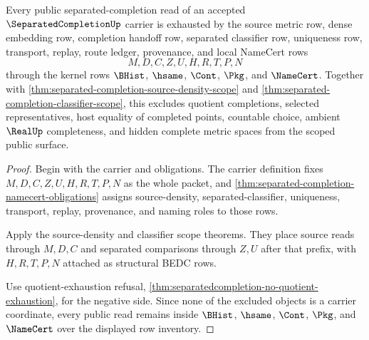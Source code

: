 \begin{theorem}
\label{thm:separated-completion-nonescape-scope}
Every public separated-completion read of an accepted $\SeparatedCompletionUp$ carrier is exhausted by the source metric row, dense embedding row, completion handoff row, separated classifier row, uniqueness row, transport, replay, route ledger, provenance, and local NameCert rows
$$
M,D,C,Z,U,H,R,T,P,N
$$
through the kernel rows $\BHist$, $\hsame$, $\Cont$, $\Pkg$, and $\NameCert$. Together with \autoref{thm:separated-completion-source-density-scope} and \autoref{thm:separated-completion-classifier-scope}, this excludes quotient completions, selected representatives, host equality of completed points, countable choice, ambient $\RealUp$ completeness, and hidden complete metric spaces from the scoped public surface.
\end{theorem}
\begin{proof}
Begin with the carrier and obligations. The carrier definition fixes $M,D,C,Z,U,H,R,T,P,N$ as the whole packet, and \autoref{thm:separated-completion-namecert-obligations} assigns source-density, separated-classifier, uniqueness, transport, replay, provenance, and naming roles to those rows.

Apply the source-density and classifier scope theorems. They place source reads through $M,D,C$ and separated comparisons through $Z,U$ after that prefix, with $H,R,T,P,N$ attached as structural BEDC rows.

Use quotient-exhaustion refusal, \autoref{thm:separatedcompletion-no-quotient-exhaustion}, for the negative side. Since none of the excluded objects is a carrier coordinate, every public read remains inside $\BHist$, $\hsame$, $\Cont$, $\Pkg$, and $\NameCert$ over the displayed row inventory.
\end{proof}

